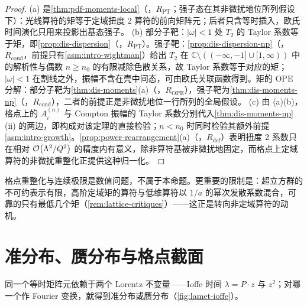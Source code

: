 \begin{proof}
(a) 是\cref{thm:pdf-moments-local}（\tagR，$R_{\mathrm{PT}}$；强子态在其非微扰地位所列假设下）：光线算符的矩等于定域扭度 2 算符的前向矩阵元；后者只含等时插入，欧氏时间演化只用来投影出基态强子。
(b) 部分子靶：$|\omega|<1$ 处 $T_2$ 的 Taylor 系数等于矩，即\cref{prop:dis-dispersion}（\tagR，$R_{\mathrm{PT}}$）。强子靶：\cref{prop:dis-dispersion-np}（\tagR，$R_{\mathrm{cond}}$，前提只有\cref{asm:intro-wightman}）给出 $T_2$ 在 $\mathbb C\setminus((-\infty,-1]\cup[1,\infty))$ 中的解析性与偶数 $n\ge n_0$ 的有限减除色散关系，故 Taylor 系数等于对应的矩；$|\omega|<1$ 在割线之外，振幅不含在壳中间态，可由欧氏关联函数得到。矩的 OPE 分解：部分子靶为\cref{thm:dis-moments}(a)（\tagR，$R_{\mathrm{OPE}}$），强子靶为\cref{thm:dis-moments-np}（\tagR，$R_{\mathrm{cond}}$），二者的前提正是非微扰地位一行所列的全局假设。
(c) 由 (a)(b)，格点上的 $A^{(n)}_i$ 与 Compton 振幅的 Taylor 系数分别代入\cref{thm:dis-moments-np}(ii) 的两边，即构成对该定理的直接检验；$n<n_0$ 时同时检验其额外前提\cref{asm:intro-growth}。\cref{prop:power-rearrangement}(a)（\tagR，$R_{\mathrm{def}}$）表明扭度 2 系数只在相对 $\mathcal{O}\!\left(\Lambda^2/Q^2\right)$ 的精度内有意义，除非算符基被非微扰地固定，而格点上定域算符的非微扰重整化正提供这种归一化。
\end{proof}

格点重整化与连续极限是数值问题，不属于本命题。更重要的限制是：超立方群的不可约表示有限，高阶定域矩的算符与低维算符以 $1/a$ 的幂次发散系数混合，可靠的只有最低几个矩（\cref{rem:lattice-critiques}）——这正是转向非定域算符的动机。

\section{准分布、赝分布与格点截面}\label{sec:lattice-quasi}

同一个等时矩阵元依赖于两个 Lorentz 不变量——Ioffe 时间 $\lambda=P\cdot z$ 与 $z^2$；对哪一个作 Fourier 变换，就得到准分布或赝分布（\cref{fig:lamet-ioffe}）。

